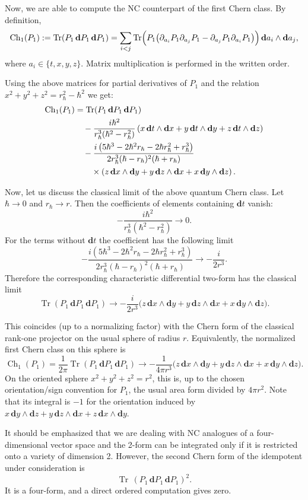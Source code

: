 \documentclass[10pt,a4paper]{amsart}
\DeclareMathOperator{\Tr}{Tr}
\newcommand{\hh}{\hbar}
\newcommand{\rh}{r_{\hbar}}
\newcommand{\dd}{\mathbf{d}}
\numberwithin{equation}{section}
\begin{document}
Now, we are able to compute the NC counterpart of the first Chern class. By definition,
\[
\operatorname{Ch}_1(P_1) := \Tr(P_1\,\dd P_1\,\dd P_1)
=\sum_{i<j}\Tr\Bigl(P_1\big(\partial_{a_i}P_1\partial_{a_j}P_1-\partial_{a_j}P_1\partial_{a_i}P_1\big)\Bigr)\,\dd {a_i}\wedge \dd {a_j},
\]
where $a_i\in\{t,x,y,z\}$. Matrix multiplication is performed in the written order.

Using the above matrices for partial derivatives of $P_1$ and the relation $x^2+y^2+z^2=\rh^2-\hh^2$ we get:
\begin{align}
\operatorname{Ch}_1(P_1)
&= \Tr(P_1\,\dd P_1\,\dd P_1) \notag\\
&\quad-\frac{i\hh^2}{\rh^3(\hh^2-\rh^2)}
\left(x\,\dd t\wedge \dd x+y\,\dd t\wedge \dd y+z\,\dd t\wedge \dd z\right) \notag\\
&\quad-\frac{i\left(5\hh^3-2\hh^2\rh-2\hh\rh^2+\rh^3\right)}
{2\rh^3(\hh-\rh)^2(\hh+\rh)} \notag\\
&\qquad\times
\left(z\,\dd x\wedge \dd y+y\,\dd z\wedge \dd x+x\,\dd y\wedge \dd z\right).
\label{first-q-Ch}
\end{align}

Now, let us discuss the classical limit of the above quantum Chern class. Let $\hh\to 0$ and $\rh\to r$. Then the coefficients
of elements containing $\dd t$ vanish:
\[
-\frac{i\hh^2}{\rh^3(\hh^2-\rh^2)}\longrightarrow 0.
\]
For the terms without $\dd t$ the coefficient  has the following limit
\[
-\frac{i(5\hh^3-2\hh^2\rh-2\hh\rh^2+\rh^3)}
{2\rh^3(\hh-\rh)^2(\hh+\rh)}
\longrightarrow
-\frac{i}{2r^3}.
\]
Therefore the corresponding characteristic differential two-form has the classical limit
\[
\Tr(P_1\,\dd P_1\,\dd P_1)
\longrightarrow
-\frac{i}{2r^3}
\bigl(z\,\dd x\wedge \dd y+y\,\dd z\wedge \dd x+x\,\dd y\wedge \dd z\bigr).
\]

This coincides  (up to a normalizing factor) with the Chern form of  the classical rank-one projector on the usual sphere of radius
$r$. Equivalently, the normalized first Chern class on this sphere  is
\[
\operatorname{Ch}_1(P_1)
=\frac{1}{2\pi}\Tr(P_1\,\dd P_1\,\dd P_1)
\longrightarrow
-\frac{1}{4\pi r^3}
\bigl(z\,\dd x\wedge \dd y+y\,\dd z\wedge \dd x+x\,\dd y\wedge \dd z\bigr).
\]
On the oriented sphere $x^2+y^2+z^2=r^2$, this is, up to the chosen orientation/sign convention for
$P_1$, the usual area form divided by $4\pi r^2$. Note that its integral is $-1$ for the orientation induced by
$x\,\dd y\wedge \dd z+y\,\dd z\wedge \dd x+z\,\dd x\wedge \dd y$.

It should be emphasized that we are dealing with NC analogues of a four-dimensional vector space and the 2-form can be integrated
only if it is restricted onto a variety of dimension 2. However, the second Chern form of the idempotent under consideration is
\[
\Tr\,(P_1\,\dd P_1\,\dd P_1)^2.
\]
It is a four-form, and a direct ordered computation gives zero.
\end{document}
